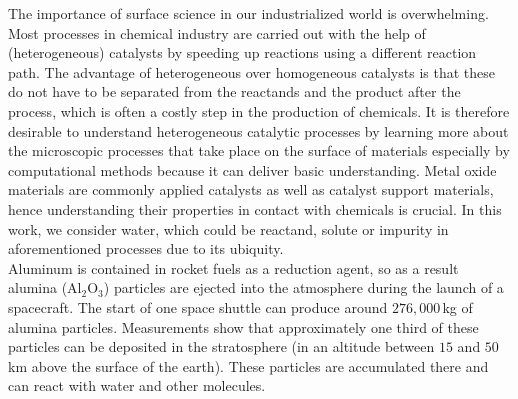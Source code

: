 \documentclass[11pt,DIV=13,BCOR=5mm,a4paper,headinclude]{scrbook}
\begin{document}
The importance of surface science in our industrialized world is overwhelming.
Most processes in chemical industry are carried out with the help of (heterogeneous) catalysts\cite{Ago2005,Cargnello2012,Knozinger1978} by speeding up reactions using a different reaction path.
The advantage of heterogeneous over homogeneous catalysts is that these do not have to be separated from the reactands and the product after the process, which is often a costly step in the production of chemicals.
It is therefore desirable to understand heterogeneous catalytic processes by learning more about the microscopic processes that take place on the surface of materials especially by computational methods because it can deliver basic understanding.
Metal oxide materials are commonly applied catalysts as well as catalyst support materials, hence understanding their properties in contact with chemicals is crucial.
In this work, we consider water, which could be reactand, solute or impurity in aforementioned processes due to its ubiquity.
\\

Aluminum is contained in rocket fuels as a reduction agent, so as a result alumina (Al$_2$O$_3$) particles are ejected into the atmosphere during the launch of a spacecraft\cite{Elam1998}.
The start of one space shuttle can produce around $276,000\,$kg of alumina particles\cite{Potter1978}.
Measurements show that approximately one third of these particles can be deposited in the stratosphere\cite{Cofer1978} (in an altitude between $15$ and $50\,$km above the surface of the earth).
These particles are accumulated there and can react with water and other molecules\cite{Jones1995,Jackman1996}.
\\
\end{document}
